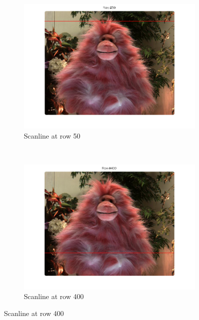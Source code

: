 \documentclass[a4paper]{article}
\begin{document}
\begin{figure}[ht]
	\begin{subfigure}[h]{0.48\textwidth}
	  \includegraphics[width=\textwidth]{scanline50}
	  \caption*{Scanline at row 50}
	\end{subfigure}
    	~
	\begin{subfigure}[h]{0.48\textwidth}
	  \centering
	  \includegraphics[width=\textwidth]{scanline400}
	  \caption*{Scanline at row 400}
	\end{subfigure}
	

\end{figure}
\end{document}
